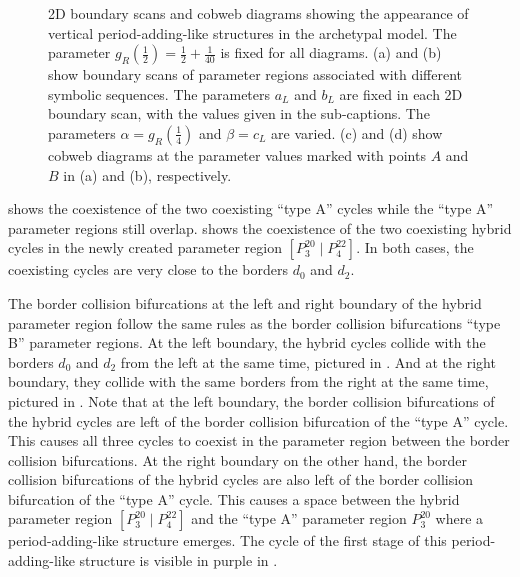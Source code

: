 \begin{figure}
{		\label{fig:add.change.appa.vert.cobweb.B}
	}
	\caption[2D boundary scans and cobweb diagrams showing the appearance of vertical period-adding-like structures in the archetypal model]{
		2D boundary scans and cobweb diagrams showing the appearance of vertical period-adding-like structures in the archetypal model.
		The parameter $g_R\left(\frac{1}{2}\right) = \frac{1}{2} + \frac{1}{40}$ is fixed for all diagrams.
		(a) and (b) show boundary scans of parameter regions associated with different symbolic sequences.
		The parameters $a_L$ and $b_L$ are fixed in each 2D boundary scan, with the values given in the sub-captions.
		The parameters $\alpha = g_R\left(\frac{1}{4}\right)$ and $\beta = c_L$ are varied.
		(c) and (d) show cobweb diagrams at the parameter values marked with points $A$ and $B$ in (a) and (b), respectively.
	}
\end{figure}

 shows the coexistence of the two coexisting ``type A'' cycles while the ``type A'' parameter regions still overlap.
 shows the coexistence of the two coexisting hybrid cycles in the newly created parameter region $\left[P^{20}_3 \mid P^{22}_4\right]$.
In both cases, the coexisting cycles are very close to the borders $d_0$ and $d_2$.

The border collision bifurcations at the left and right boundary of the hybrid parameter region follow the same rules as the border collision bifurcations ``type B'' parameter regions.
At the left boundary, the hybrid cycles collide with the borders $d_0$ and $d_2$ from the left at the same time, pictured in .
And at the right boundary, they collide with the same borders from the right at the same time, pictured in .
Note that at the left boundary, the border collision bifurcations of the hybrid cycles are left of the border collision bifurcation of the ``type A'' cycle.
This causes all three cycles to coexist in the parameter region between the border collision bifurcations.
At the right boundary on the other hand, the border collision bifurcations of the hybrid cycles are also left of the border collision bifurcation of the ``type A'' cycle.
This causes a space between the hybrid parameter region $\left[P^{20}_3 \mid P^{22}_4\right]$ and the ``type A'' parameter region $P^{20}_3$ where a period-adding-like structure emerges.
The cycle of the first stage of this period-adding-like structure is visible in purple in .

